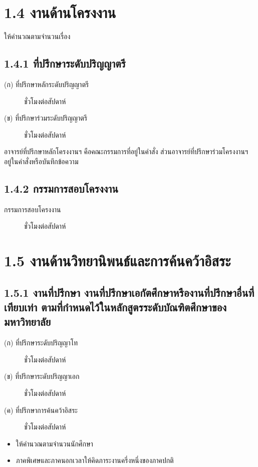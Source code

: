 \documentclass[a4paper,12pt,english]{sphinxmanual}
\begin{document}
\section{1.4 งานด้านโครงงาน}
\label{\detokenize{1teaching:id14}}
ให้คำนวณตามจำนวนเรื่อง


\subsection{1.4.1 ที่ปรึกษาระดับปริญญาตรี}
\label{\detokenize{1teaching:id15}}\begin{description}
\item[{(ก) ที่ปรึกษาหลักระดับปริญญาตรี}]  ชั่วโมงต่อสัปดาห์

\item[{(ข) ที่ปรึกษาร่วมระดับปริญญาตรี}]  ชั่วโมงต่อสัปดาห์

\end{description}

อาจารย์ที่ปรึกษาหลักโครงงานฯ คือคณะกรรมการที่อยู่ในคำสั่ง ส่วนอาจารย์ที่ปรึกษาร่วมโครงงานฯ อยู่ในคำสั่งหรือบันทึกข้อความ


\subsection{1.4.2 กรรมการสอบโครงงาน}
\label{\detokenize{1teaching:id16}}\begin{description}
\item[{กรรมการสอบโครงงาน}]  ชั่วโมงต่อสัปดาห์

\end{description}


\section{1.5 งานด้านวิทยานิพนธ์และการค้นคว้าอิสระ}
\label{\detokenize{1teaching:id17}}

\subsection{1.5.1 งานที่ปรึกษา งานที่ปรึกษาเอกัตศึกษาหรืองานที่ปรึกษาอื่นที่เทียบเท่า ตามที่กำหนดไว้ในหลักสูตรระดับบัณฑิตศึกษาของมหาวิทยาลัย}
\label{\detokenize{1teaching:id18}}\begin{description}
\item[{(ก) ที่ปรึกษาระดับปริญญาโท}]  ชั่วโมงต่อสัปดาห์

\item[{(ข) ที่ปรึกษาระดับปริญญาเอก}]  ชั่วโมงต่อสัปดาห์

\item[{(ค) ที่ปรึกษาการค้นคว้าอิสระ}]  ชั่วโมงต่อสัปดาห์

\end{description}
\begin{itemize}
\item {} 
ให้คำนวณตามจำนวนนักศึกษา

\item {} 
ภาคพิเศษและภาคนอกเวลาให้คิดภาระงานครึ่งหนึ่งของภาคปกติ

\end{itemize}
\end{document}
